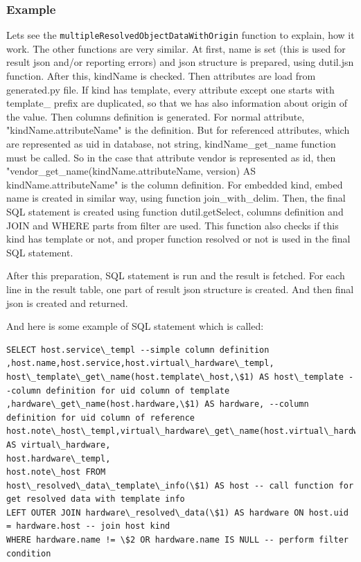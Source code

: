 \documentclass[deska]{subfiles}
\begin{document}
\subsubsection{Example}
Lets see the {\tt multipleResolvedObjectDataWithOrigin} function to explain, how it work. The other functions are very similar.
At first, name is set (this is used for result json and/or reporting errors) and json structure is prepared,
using dutil.jsn function. After this, kindName is checked. Then attributes are load from generated.py file.
If kind has template, every attribute except one starts with template\_ prefix are duplicated, so that we has
also information about origin of the value.
Then columns definition is generated. For normal attribute, "kindName.attributeName" is the definition.
But for referenced attributes, which are
represented as uid in database, not string, kindName\_get\_name function must be called. So in the case that attribute vendor is represented as id, then
"vendor\_get\_name(kindName.attributeName, version) AS kindName.attributeName" is the column definition. For embedded kind, embed name is created in similar way,
using function join\_with\_delim.
Then, the final SQL statement is created using function dutil.getSelect, columns definition and JOIN and WHERE parts from filter are used.
This function also checks if this kind has template or not, and proper function resolved or not is used in the final SQL statement.

After this preparation, SQL statement is run and the result is fetched. For each line in the result table, one part of result json structure is
created. And then final json is created and returned.

And here is some example of SQL statement which is called:
\begin{verbatim}
SELECT host.service\_templ --simple column definition
,host.name,host.service,host.virtual\_hardware\_templ,
host\_template\_get\_name(host.template\_host,\$1) AS host\_template --column definition for uid column of template
,hardware\_get\_name(host.hardware,\$1) AS hardware, --column definition for uid column of reference
host.note\_host\_templ,virtual\_hardware\_get\_name(host.virtual\_hardware,\$1) AS virtual\_hardware,
host.hardware\_templ,
host.note\_host FROM
host\_resolved\_data\_template\_info(\$1) AS host -- call function for get resolved data with template info
LEFT OUTER JOIN hardware\_resolved\_data(\$1) AS hardware ON host.uid = hardware.host -- join host kind
WHERE hardware.name != \$2 OR hardware.name IS NULL -- perform filter condition
\end{verbatim}
\end{document}
